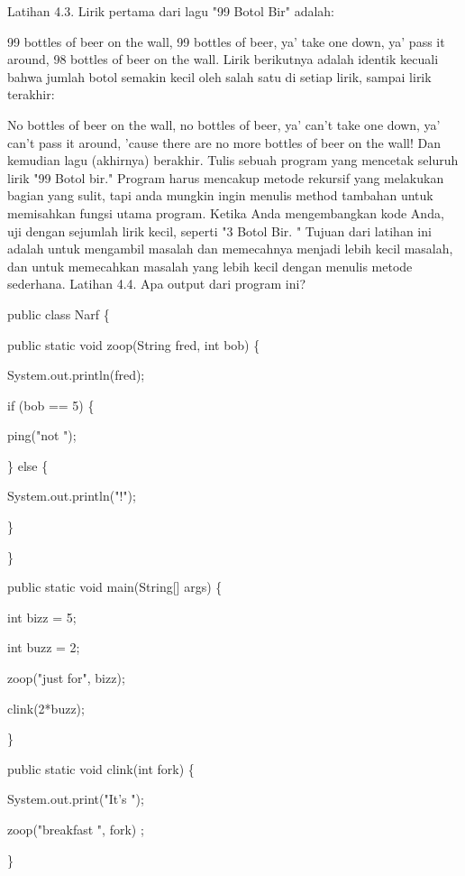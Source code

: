 Latihan 4.3. Lirik pertama dari lagu "99 Botol Bir" adalah:
\newline
\par
99 bottles of beer on the wall, 99 bottles of beer, ya’ take one
down, ya’ pass it around, 98 bottles of beer on the wall.
\newline
\newline
Lirik berikutnya adalah identik kecuali bahwa jumlah botol semakin kecil oleh salah satu di setiap lirik, sampai lirik terakhir:
\newline
\par
No bottles of beer on the wall, no bottles of beer, ya’ can’t take one down, ya’ can’t pass it around, ’cause there are no more
bottles of beer on the wall!
\newline
\newline
Dan kemudian lagu (akhirnya) berakhir.
\newline
\newline
Tulis sebuah program yang mencetak seluruh lirik "99 Botol bir." Program harus mencakup metode rekursif yang melakukan bagian yang sulit, tapi anda mungkin ingin menulis method tambahan untuk memisahkan fungsi utama program.
\newline
\newline
Ketika Anda mengembangkan kode Anda, uji dengan sejumlah lirik kecil, seperti "3 Botol Bir. "
\newline
\newline
Tujuan dari latihan ini adalah untuk mengambil masalah dan memecahnya menjadi lebih kecil masalah, dan untuk memecahkan masalah yang lebih kecil dengan menulis metode sederhana.
\newline
\newline
Latihan 4.4. Apa output dari program ini?
\newline
\par
public class Narf \{
\par
	public static void zoop(String fred, int bob) \{
	\par
		System.out.println(fred);
		\par
		if (bob == 5) \{
		\par
			ping("not ");
			\par
		\} else \{
		\par
		System.out.println("!");
		\par
	\}
	\par
\}
\newline
\par
public static void main(String[] args) \{
\par
	int bizz = 5;
	\par
	int buzz = 2;
	\par
	zoop("just for", bizz);
	\par
	clink(2*buzz);
	\par
\}
\newline
\par
public static void clink(int fork) \{
\par
	System.out.print("It's ");
	\par
	zoop("breakfast ", fork) ;
	\par
\}
\newline
\par

